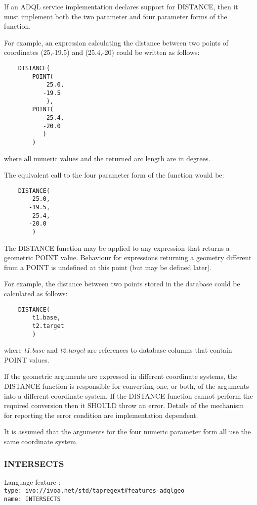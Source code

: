 \documentclass[11pt,a4paper]{ivoa}
\begin{document}
If an ADQL service implementation declares support for DISTANCE,
then it must implement both the two parameter and four parameter
forms of the function.

For example, an expression calculating the distance between two points of
coordinates (25,-19.5) and (25.4,-20) could be written as follows:
\begin{verbatim}
    DISTANCE(
        POINT(
            25.0,
           -19.5
            ),
        POINT(
            25.4,
           -20.0
           )
        )
\end{verbatim}
\noindent
where all numeric values and the returned arc length are in degrees.

The equivalent call to the four parameter form of the function would be:
\begin{verbatim}
    DISTANCE(
        25.0,
       -19.5,
        25.4,
       -20.0
        )
\end{verbatim}

The DISTANCE function may be applied to any expression that returns a
geometric POINT value. Behaviour for expressions returning a geometry different
from a POINT is undefined at this point (but may be defined later).

For example, the distance between two points stored in the database could
be calculated as follows:
\begin{verbatim}
    DISTANCE(
        t1.base,
        t2.target
        )
\end{verbatim}
\noindent
where \textit{t1.base} and \textit{t2.target} are references to
database columns that contain POINT values.

If the geometric arguments are expressed in different coordinate systems,
the DISTANCE function is responsible for converting one, or both, of the
arguments into a different coordinate system.
If the DISTANCE function cannot perform the required conversion then
it SHOULD throw an error.
Details of the mechanism for reporting the error condition are
implementation dependent.

It is assumed that the arguments for the four numeric parameter form all
use the same coordinate system.

\subsubsection{INTERSECTS}
\label{sec:functions.geom.intersects}
{\footnotesize Language feature :}\\
{\footnotesize \verb|type: ivo://ivoa.net/std/tapregext#features-adqlgeo|}\\
{\footnotesize \verb|name: INTERSECTS|}\\
\end{document}
